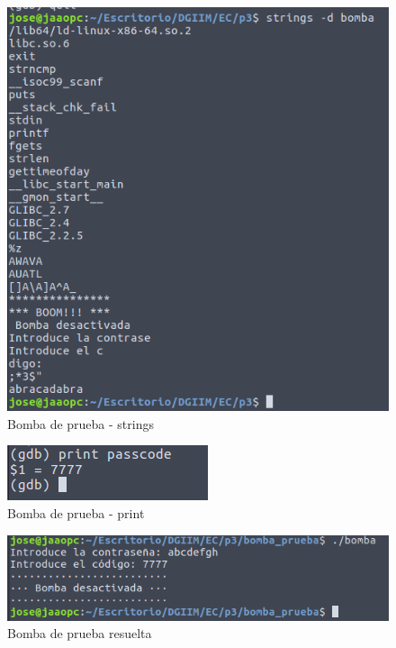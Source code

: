 \documentclass[11pt,a4paper]{article}
\begin{document}
\begin{figure}[H] 
 \centering
 \includegraphics[scale=0.45]{capturas/prueba3.png} 
 \caption{Bomba de prueba - strings} \label{fig:figura25}
\end{figure}

\begin{figure}[H] 
 \centering
 \includegraphics[scale=0.45]{capturas/prueba4.png} 
 \caption{Bomba de prueba - print} \label{fig:figura25}
\end{figure}

\begin{figure}[H] 
 \centering
 \includegraphics[scale=0.45]{capturas/prueba5.png} 
 \caption{Bomba de prueba resuelta} \label{fig:figura25}
\end{figure}
\end{document}
